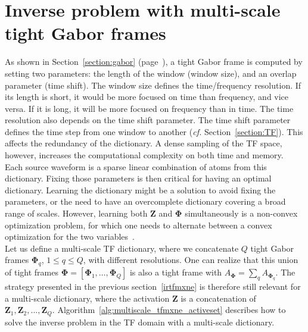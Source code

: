 \section{Inverse problem with multi-scale tight Gabor frames}
As shown in Section~\ref{section:gabor} (page~\pageref{section:gabor}), a tight Gabor frame is computed by setting two parameters: the length of the window (window size), and an overlap parameter (time shift). The window size defines the time/frequency resolution. If its length is short, it would be more focused on time than frequency, and vice versa. If it is long, it will be more focused on frequency than in time. The time resolution also depends on the time shift parameter. The time shift parameter defines the time step from one window to another (\textit{cf.} Section~\ref{section:TF}). This affects the redundancy of the dictionary. A dense sampling of the TF space, however, increases the computational complexity on both time and memory.\\

Each source waveform is a sparse linear combination of atoms from this dictionary. Fixing those parameters is then critical for having an optimal dictionary. %
Learning the dictionary might be a solution to avoid fixing the parameters, or the need to have an overcomplete dictionary covering a broad range of scales. However, learning both $\mathbf{Z}$ and $\mathbf{\Phi}$ simultaneously is a non-convex optimization problem, for which one needs to alternate between a convex optimization for the two variables~\cite{montoya2014regularized}. \\


Let us define a multi-scale TF dictionary, where we concatenate $Q$ tight Gabor frames $\mathbf{\Phi}_q$, $ 1 \leq q \leq Q$, with different resolutions. One can realize that this union of tight frames $\mathbf{\Phi} = [\mathbf{\Phi}_1, \dots, \mathbf{\Phi}_Q]$ is also a tight frame with $A_\mathbf{\Phi} = \sum_q A_{\mathbf{\Phi}_q}$. The strategy presented in the previous section~\ref{irtfmxne} is therefore still relevant for a multi-scale dictionary, where the activation $\mathbf{Z}$ is a concatenation of $\mathbf{Z}_1, \mathbf{Z}_2, ..., \mathbf{Z}_Q$. Algorithm~\ref{alg:multiscale_tfmxne_activeset} describes how to solve the inverse problem in the TF domain with a multi-scale dictionary.

